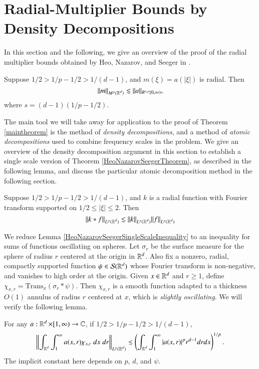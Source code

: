 \section{Radial-Multiplier Bounds by Density Decompositions} \label{sec:densitydecompositions}

In this section and the following, we give an overview of the proof of the radial multiplier bounds obtained by Heo, Nazarov, and Seeger in \cite{HeoandNazarovandSeeger}.

\begin{theorem} \label{HeoNazarovSeegerTheorem}
    Suppose $1/2 > 1/p - 1/2 > 1/(d-1)$, and $m(\xi) = a(|\xi|)$ is radial. Then
    \[ \| m \|_{M^p(\operatorname{\mathbb{R}}^d)} \lesssim \| a \|_{R^{s,p}[0,\infty)}, \]
    where $s = (d-1)(1/p - 1/2)$.
\end{theorem}

The main tool we will take away for application to the proof of Theorem \ref{maintheorem} is the method of \emph{density decompositions}, and a method of \emph{atomic decompositions} used to combine frequency scales in the problem. We give an overview of the density decomposition argument in this section to establish a single scale version of Theorem \ref{HeoNazarovSeegerTheorem}, as described in the following lemma, and discuss the particular atomic decomposition method in the following section.

\begin{lemma} \label{HeoNazarovSeegerSingleScaleInequality}
  Suppose $1/2 > 1/p - 1/2 > 1/(d-1)$, and $k$ is a radial function with Fourier transform supported on $1/2 \leq |\xi| \leq 2$. Then
%
\[ \| k * f \|_{L^p(\operatorname{\mathbb{R}}^d)} \lesssim \| k \|_{L^p(\operatorname{\mathbb{R}}^d)} \| f \|_{L^p(\operatorname{\mathbb{R}}^d)} \]
%
\end{lemma}

We reduce Lemma \ref{HeoNazarovSeegerSingleScaleInequality} to an inequality for sums of functions oscillating on spheres. Let $\sigma_r$ be the surface measure for the sphere of radius $r$ centered at the origin in $\operatorname{\mathbb{R}}^d$. Also fix a nonzero, radial, compactly supported function $\psi \in \mathcal{S}(\operatorname{\mathbb{R}}^d)$ whose Fourier transform is non-negative, and vanishes to high order at the origin. Given $x \in \operatorname{\mathbb{R}}^d$ and $r \geq 1$, define $\chi_{x, r} = \text{Trans}_x (\sigma_r * \psi)$. Then $\chi_{x,r}$ is a smooth function adapted to a thickness $O(1)$ annulus of radius $r$ centered at $x$, which is \emph{slightly oscillating}. We will verify the following lemma.

\begin{lemma} \label{lemma1}
    For any $a : \operatorname{\mathbb{R}}^d \times [1,\infty) \to \operatorname{\mathbb{C}}$, if $1/2 > 1/p - 1/2 > 1/(d-1)$,
    \[ \left\| \int_{\operatorname{\mathbb{R}}^d} \int_1^\infty a(x,r) \chi_{x, r}\; dx\; dr \right\|_{L^p(\operatorname{\mathbb{R}}^d)} \lesssim \left( \int_{\operatorname{\mathbb{R}}^d} \int_1^\infty |a(x,r)|^p r^{d-1} dr dx \right)^{1/p}. \]
    The implicit constant here depends on $p$, $d$, and $\psi$.
\end{lemma}


